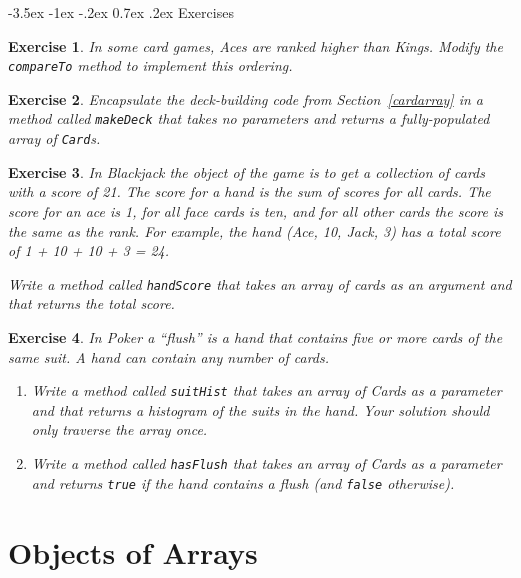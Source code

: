\documentclass[12pt]{book}
\makeatletter
\theoremstyle{exercise}
\newtheorem{exercise}{Exercise}[chapter]
\newcommand{\java}[1]{\verb"#1"}
\renewcommand{\section}{\@startsection{section}{1}{\z@}%
    {-3.5ex \@plus -1ex \@minus -.2ex}%
    {0.7ex \@plus.2ex}%
    {\normalfont\Large\bfseries}}
\newcommand{\java}[1]{\lstinline{#1}} %
\makeatother
\begin{document}
\section{Exercises}


\begin{exercise}
In some card games, Aces are ranked higher than Kings.
Modify the \java{compareTo} method to implement this ordering.
\end{exercise}


\begin{exercise}
Encapsulate the deck-building code from Section~\ref{cardarray} in a method called \java{makeDeck} that takes no parameters and returns a fully-populated array of \java{Card}s.
\end{exercise}


\begin{exercise}
In Blackjack the object of the game is to get a collection of cards with a score of 21.
The score for a hand is the sum of scores for all cards.
The score for an ace is 1, for all face cards is ten, and for all other cards the score is the same as the rank.
For example, the hand (Ace, 10, Jack, 3) has a total score of 1 + 10 + 10 + 3 = 24.

Write a method called \java{handScore} that takes an array of cards as an argument and that returns the total score.
\end{exercise}


\begin{exercise}
In Poker a ``flush'' is a hand that contains five or more cards of the same suit.
A hand can contain any number of cards.

\begin{enumerate}

\item Write a method called \java{suitHist} that takes an array of Cards as a parameter and that returns a histogram of the suits in the hand.
Your solution should only traverse the array once.

\item Write a method called \java{hasFlush} that takes an array of Cards as a parameter and returns \java{true} if the hand contains a flush (and \java{false} otherwise).

\end{enumerate}

\end{exercise}


\chapter{Objects of Arrays}
\label{Deck}
\end{document}
